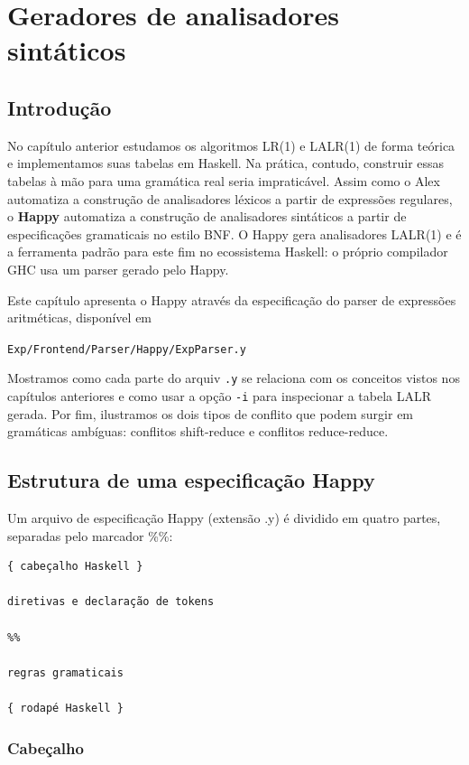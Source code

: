 \chapter{Geradores de analisadores sintáticos}

\section{Introdução}

No capítulo anterior estudamos os algoritmos LR(1) e LALR(1) de forma
teórica e implementamos suas tabelas em Haskell. Na prática, contudo,
construir essas tabelas à mão para uma gramática real seria
impraticável. Assim como o Alex automatiza a construção de
analisadores léxicos a partir de expressões regulares, o
\textbf{Happy} automatiza a construção de analisadores sintáticos a
partir de especificações gramaticais no estilo BNF. O Happy gera
analisadores LALR(1) e é a ferramenta padrão para este fim no
ecossistema Haskell: o próprio compilador GHC usa um parser gerado
pelo Happy.

Este capítulo apresenta o Happy através da especificação do parser de
expressões aritméticas, disponível em
\begin{flushleft}
  \verb|Exp/Frontend/Parser/Happy/ExpParser.y|
\end{flushleft}
Mostramos como cada parte do arquiv \texttt{.y} se
relaciona com os conceitos vistos nos capítulos anteriores e como
usar a opção \verb|-i| para inspecionar a tabela
LALR gerada. Por fim, ilustramos os dois tipos de conflito que podem
surgir em gramáticas ambíguas: conflitos shift-reduce e conflitos reduce-reduce.

\section{Estrutura de uma especificação Happy}

Um arquivo de especificação Happy (extensão .y) é dividido em quatro
partes, separadas
pelo marcador \%\%:

\begin{verbatim}
{ cabeçalho Haskell }

diretivas e declaração de tokens

%%

regras gramaticais

{ rodapé Haskell }
\end{verbatim}

\subsection{Cabeçalho}

